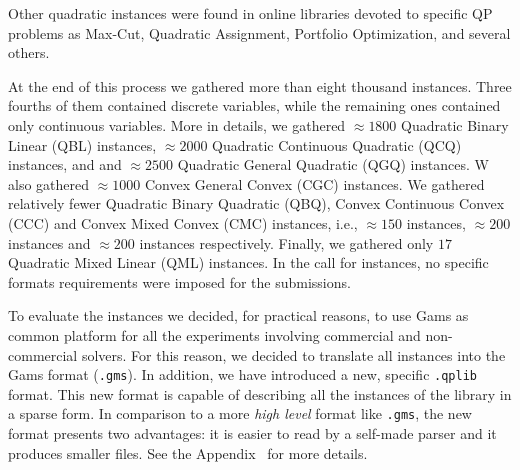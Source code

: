 Other quadratic instances were found in online libraries devoted to
specific QP problems as Max-Cut, Quadratic Assignment, Portfolio
Optimization, and several others.

At the end of this process we gathered more than eight thousand
instances. Three fourths of them contained discrete variables, while
the remaining ones contained only continuous variables. More in details,
we gathered $\approx 1800$ Quadratic Binary Linear (QBL) instances,
$\approx 2000$ Quadratic Continuous Quadratic (QCQ) instances, and
and $\approx 2500$ Quadratic General Quadratic (QGQ) instances. W
also gathered $\approx 1000$ Convex General Convex (CGC) instances. We
gathered relatively fewer Quadratic Binary Quadratic (QBQ), Convex
Continuous Convex (CCC) and Convex Mixed Convex (CMC) instances, i.e.,
$\approx 150$ instances, $\approx 200$ instances and $\approx 200$
instances respectively. Finally, we gathered only $17$ Quadratic Mixed
Linear (QML) instances. In the call for instances, no specific formats
requirements were imposed for the submissions.

To evaluate the instances we decided, for practical reasons, to use
Gams as common platform for all the experiments involving commercial and
non-commercial solvers. For this reason, we decided to translate all
instances into the Gams format (\texttt{.gms}). 
%
In addition, we have introduced a new, specific \texttt{.qplib} format. This
new format is capable of describing all the instances of the library in a sparse form.
In comparison to a more \emph{high level} format like \texttt{.gms}, the new
format presents two advantages: it is easier to read by a self-made parser and
it produces smaller files. See the Appendix~\label{sec:format} for more details.



